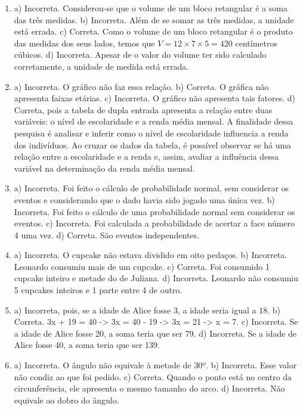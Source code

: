 \begin{enumerate}
\item a) Incorreta. Considerou-se que o volume de um bloco retangular é a soma das três medidas.
b) Incorreta. Além de se somar as três medidas, a unidade está errada.
c) Correta. Como o volume de um bloco retangular é o produto das medidas dos seus lados, temos que
$V = 12 \times 7 \times 5 = 420$ centímetros cúbicos.
d) Incorreta. Apesar de o valor do volume ter sido calculado corretamente, a unidade de medida está errada.

\item a) Incorreta. O gráfico não faz essa relação.
b) Correta. O gráfica não apresenta faixas etárias.
c) Incorreta. O gráfico não apresenta tais fatores.
d) Correta, pois a tabela de dupla entrada apresenta a relação entre duas variáveis: o nível de escolaridade e a renda média mensal. A finalidade dessa pesquisa é analisar e inferir como o nível de escolaridade influencia a renda dos indivíduos. Ao cruzar os dados da
tabela, é possível observar se há uma relação entre a escolaridade e a renda e, assim, avaliar a influência dessa variável na determinação da renda média mensal.

\item a) Incorreta. Foi feito o cálculo de probabilidade normal, sem considerar os eventos e considerando que o dado havia sido jogado uma
única vez.
b) Incorreta. Foi feito o cálculo de uma probabilidade normal sem considerar os eventos.
c) Incorreta. Foi calculada a probabilidade de acertar a face número 4 uma vez.
d) Correta. São eventos independentes. 

\item a) Incorreta. O cupcake não estava dividido em oito pedaços.
b) Incorreta. Leonardo consumiu mais de um cupcake.
c) Correta. Foi consumido 1 cupcake inteiro e metade do de Juliana.
d) Incorreta. Leonardo não consumiu 5 cupcakes inteiros e 1 parte entre 4 de outro.

\item a) Incorreta, pois, se a idade de Alice fosse 3, a idade seria igual a 18.
b) Correta. 3x + 19 = 40 -> 3x = 40 - 19 -> 3x = 21 -> x = 7.
c) Incorreta. Se a idade de Alice fosse 20, a soma teria que ser 79.
d) Incorreta. Se a idade de Alice fosse 40, a soma teria que ser 139.


\item a) Incorreta. O ângulo não equivale à metade de 30º.
b) Incorreta. Esse valor não condiz ao que foi pedido.
c) Correta. Quando o ponto está no centro da circunferência, ele apresenta o mesmo tamanho do arco.
d) Incorreta. Não equivale ao dobro do ângulo.



\end{enumerate}
